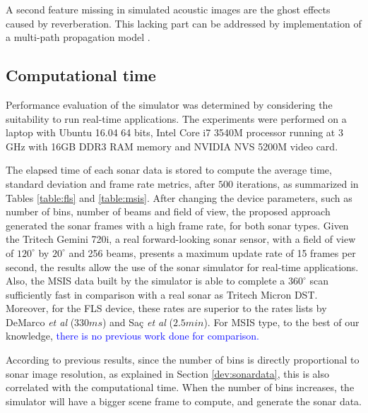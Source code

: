 \documentclass[final,5p,times]{elsarticle}
\begin{document}
A second feature missing in simulated acoustic images are the ghost effects
caused by reverberation. This lacking part can be addressed by implementation
of a multi-path propagation model \textcolor{blue}{\cite{huang2015b}}.

\subsection{Computational time}

Performance evaluation of the simulator was determined by considering the
suitability to run real-time applications. The experiments were performed
on a laptop with Ubuntu 16.04 64 bits, Intel Core i7 3540M processor
running at 3 GHz with 16GB DDR3 RAM memory and NVIDIA NVS 5200M video card.

The elapsed time of each sonar data is stored to compute the average time,
standard deviation and frame rate metrics, after $500$ iterations, as
summarized in Tables \ref{table:fls} and \ref{table:msis}. After changing
the device parameters, such as number of bins, number of beams and field
of view, the proposed approach generated the sonar frames with a high
frame rate, for both sonar types. Given the Tritech Gemini 720i, a real
forward-looking sonar sensor, with a field of view of $120^{\circ}$ by
$20^{\circ}$ and 256 beams, presents a maximum update rate of 15 frames
per second, the results allow the use of the sonar simulator for real-time
applications. Also, the MSIS data built by the simulator is able to
complete a $360^{\circ}$ scan sufficiently fast in comparison with a
real sonar as Tritech Micron DST. Moreover, for the FLS device, these
rates are superior to the rates lists by DeMarco \textit{et al}
\cite{demarco2015} ($330 ms$) and Saç \textit{et al} \cite{sac2015}
($2.5 min$). For MSIS type, to the best of our knowledge, \textcolor{blue}{there is no
previous work done for comparison.}

According to previous results, since the number of bins is directly
proportional to sonar image resolution, as explained in Section
\ref{dev:sonardata}, this is also correlated with the computational time.
When the number of bins increases, the simulator will have a bigger scene
frame to compute, and generate the sonar data.
\end{document}
